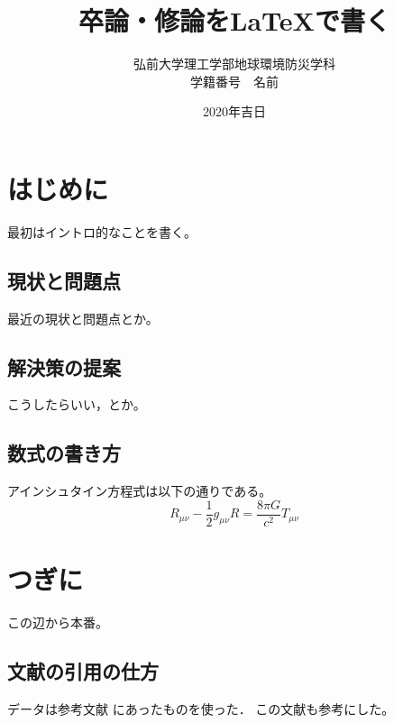\documentclass[a4paper,12pt]{jsreport}
\title{卒論・修論を\LaTeX で書く}
\author{弘前大学理工学部地球環境防災学科\\
学籍番号　名前}
\date{2020年吉日}
\begin{document}
\maketitle
\tableofcontents

\chapter{はじめに}

最初はイントロ的なことを書く。
\section{現状と問題点}

最近の現状と問題点とか。

\section{解決策の提案}

こうしたらいい，とか。

\section{数式の書き方}

アインシュタイン方程式は以下の通りである。
\begin{equation}
    R_{\mu\nu} - \frac{1}{2} g_{\mu\nu} R = 
    \frac{8\pi G}{c^2} T_{\mu\nu}
\end{equation}



\chapter{つぎに}

この辺から本番。

\section{文献の引用の仕方} 

データは参考文献\cite{rika} にあったものを使った．
この文献\cite{ten}も参考にした。

\end{document}
